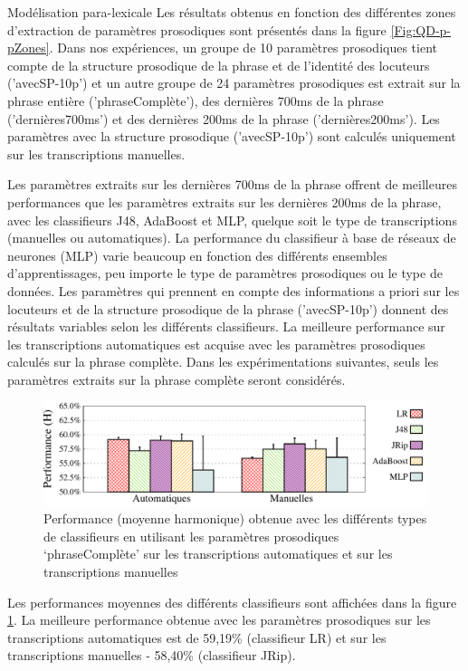 \documentclass{style/these}
\begin{document}
\begin{part}{Modélisation para-lexicale}
Les résultats obtenus en fonction des différentes zones d'extraction de paramètres prosodiques sont présentés dans la figure \ref{Fig:QD-p-pZones}. 
Dans nos expériences, un groupe de 10 paramètres prosodiques tient compte de la structure prosodique de la phrase et de l'identité des locuteurs ('avecSP-10p') et un autre groupe de 24 paramètres prosodiques est extrait sur la phrase entière ('phraseComplète'), des dernières 700ms de la phrase ('dernières700ms') et des dernières 200ms de la phrase ('dernières200ms'). 
Les paramètres avec la structure prosodique ('avecSP-10p') sont calculés uniquement sur les transcriptions manuelles. 

Les paramètres extraits sur les dernières 700ms de la phrase offrent de meilleures performances que les paramètres extraits sur les dernières 200ms de la phrase, avec les classifieurs J48, AdaBoost et MLP, quelque soit le type de transcriptions (manuelles ou automatiques). 
La performance du classifieur à base de réseaux de neurones (MLP) varie beaucoup en fonction des différents ensembles d'apprentissages, peu importe le type de paramètres prosodiques ou le type de données. 
Les paramètres qui prennent en compte des informations a priori sur les locuteurs et de la structure prosodique de la phrase ('avecSP-10p') donnent des résultats variables selon les différents classifieurs. 
La meilleure performance sur les transcriptions automatiques est acquise avec les paramètres prosodiques calculés sur la phrase complète. 
Dans les expérimentations suivantes, seuls les paramètres extraits sur la phrase complète seront considérés. 

\begin{figure}[h!]
\centering
\includegraphics[scale=0.56]{images/results/prosodicClassifier_completeSentence_compareManualVsAutomatic.pdf}
\caption{Performance (moyenne harmonique) obtenue avec les différents types de classifieurs en utilisant les paramètres prosodiques `phraseComplète' sur les transcriptions automatiques et  sur les transcriptions manuelles}
\label{Fig:QD-P-MvsA}
\end{figure}

Les performances moyennes  des différents classifieurs sont affichées dans la figure \ref{Fig:QD-P-MvsA}. 
La meilleure performance obtenue avec les paramètres prosodiques sur les transcriptions automatiques est de 59,19\% (classifieur LR) et sur les transcriptions manuelles - 58,40\% (classifieur JRip). 


\end{part}
\end{document}
